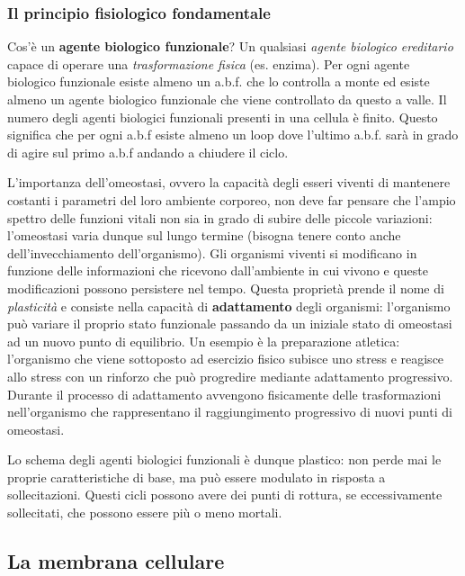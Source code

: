 \documentclass[]{article}
\begin{document}
\subsubsection{Il principio fisiologico
fondamentale}\label{il-principio-fisiologico-fondamentale}

Cos'è un \textbf{agente biologico funzionale}? Un qualsiasi \emph{agente
biologico ereditario} capace di operare una \emph{trasformazione fisica}
(es. enzima). Per ogni agente biologico funzionale esiste almeno un
a.b.f. che lo controlla a monte ed esiste almeno un agente biologico
funzionale che viene controllato da questo a valle. Il numero degli
agenti biologici funzionali presenti in una cellula è finito. Questo
significa che per ogni a.b.f esiste almeno un loop dove l'ultimo a.b.f.
sarà in grado di agire sul primo a.b.f andando a chiudere il ciclo.

L'importanza dell'omeostasi, ovvero la capacità degli esseri viventi di
mantenere costanti i parametri del loro ambiente corporeo, non deve far
pensare che l'ampio spettro delle funzioni vitali non sia in grado di
subire delle piccole variazioni: l'omeostasi varia dunque sul lungo
termine (bisogna tenere conto anche dell'invecchiamento dell'organismo).
Gli organismi viventi si modificano in funzione delle informazioni che
ricevono dall'ambiente in cui vivono e queste modificazioni possono
persistere nel tempo. Questa proprietà prende il nome di
\emph{plasticità} e consiste nella capacità di \textbf{adattamento}
degli organismi: l'organismo può variare il proprio stato funzionale
passando da un iniziale stato di omeostasi ad un nuovo punto di
equilibrio. Un esempio è la preparazione atletica: l'organismo che viene
sottoposto ad esercizio fisico subisce uno stress e reagisce allo stress
con un rinforzo che può progredire mediante adattamento progressivo.
Durante il processo di adattamento avvengono fisicamente delle
trasformazioni nell'organismo che rappresentano il raggiungimento
progressivo di nuovi punti di omeostasi.

Lo schema degli agenti biologici funzionali è dunque plastico: non perde
mai le proprie caratteristiche di base, ma può essere modulato in
risposta a sollecitazioni. Questi cicli possono avere dei punti di
rottura, se eccessivamente sollecitati, che possono essere più o meno
mortali.

\subsection{La membrana cellulare}\label{la-membrana-cellulare}
\end{document}
